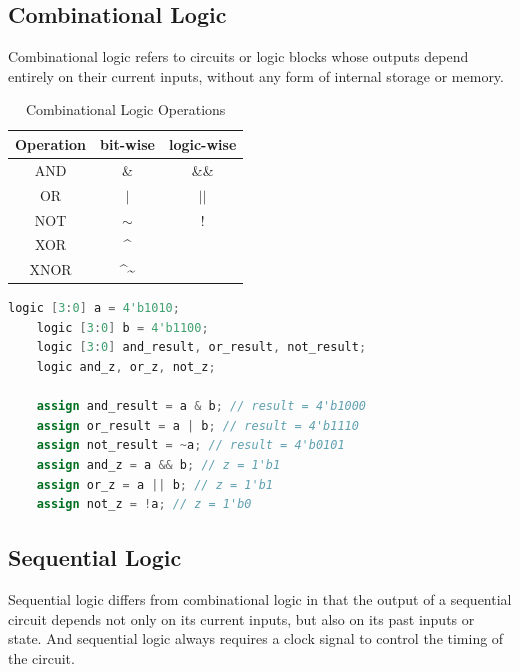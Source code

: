 \documentclass{article}
\begin{document}
\subsection{Combinational Logic}
Combinational logic refers to circuits or logic blocks whose outputs depend entirely on their current inputs, without any form of internal storage or memory.
\begin{table}[h]
    \centering
    \begin{tabular}{|c|c|c|}
        \hline
        \textbf{Operation} & \textbf{bit-wise} & \textbf{logic-wise} \\
        \hline
        AND & \& & \&\& \\
        OR & $|$ & $||$ \\
        NOT & $\sim$ & $!$ \\
        XOR & \^{} &  \\
        XNOR & \^{}\textasciitilde &  \\
        \hline
    \end{tabular}
    \caption{Combinational Logic Operations}
\end{table}
\begin{lstlisting}[language=Verilog,frame=single,backgroundcolor=\color{White},basicstyle=\color{LightGreen},showspaces=false,showstringspaces=false]
    logic [3:0] a = 4'b1010;
    logic [3:0] b = 4'b1100;
    logic [3:0] and_result, or_result, not_result;
    logic and_z, or_z, not_z;

    assign and_result = a & b; // result = 4'b1000
    assign or_result = a | b; // result = 4'b1110
    assign not_result = ~a; // result = 4'b0101
    assign and_z = a && b; // z = 1'b1
    assign or_z = a || b; // z = 1'b1
    assign not_z = !a; // z = 1'b0
\end{lstlisting}

\subsection{Sequential Logic}
Sequential logic differs from combinational logic in that the output of a sequential circuit depends not only on its current inputs, but also on its past inputs or state. And sequential logic always requires a clock signal to control the timing of the circuit.
\end{document}
